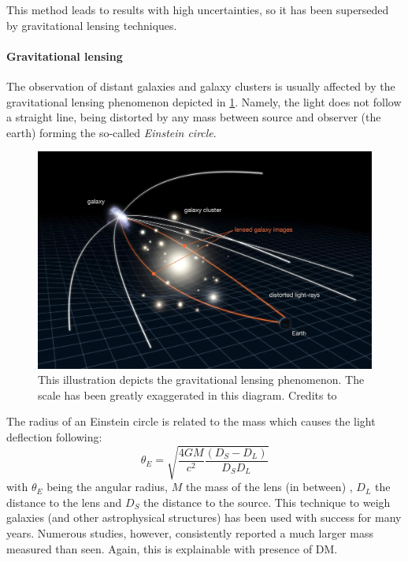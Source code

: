 This method leads to results with high uncertainties, so it has been superseded by gravitational lensing techniques.

\paragraph{Gravitational lensing}

The observation of distant galaxies and galaxy clusters is usually affected by the gravitational lensing phenomenon depicted in \cref{fig:grav_lense}.
Namely, the light does not follow a straight line, being distorted by any mass between source and observer (the earth) forming the so-called \textit{Einstein circle}.

\begin{figure}
    \centering
    \includegraphics[width=\textwidth]{Theory/figures/gravitational_lense.png}
    \caption[Graphical depiction of gravitational lensing]{This illustration depicts the gravitational lensing phenomenon. The scale has been greatly exaggerated in this diagram. Credits to \cite{fig_lensing}}
    \label{fig:grav_lense}
\end{figure}

The radius of an Einstein circle is related to the mass which causes the light deflection following:
\begin{equation}
    \theta_E = \sqrt{\frac{4GM}{c^2}\frac{(D_S-D_L)}{D_S D_L}}
\end{equation}
with $\theta_E$ being the angular radius, $M$ the mass of the lens (in between) , $D_L$ the distance to the lens and $D_S$ the distance to the source.
This technique to weigh galaxies (and other astrophysical structures) has been used with success for many years.
Numerous studies, however, consistently reported a much larger mass measured than seen.
Again, this is explainable with presence of DM.



